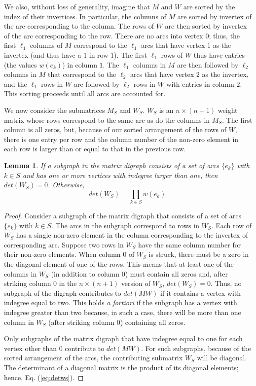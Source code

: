\documentclass{article}
\newtheorem{lemma}{Lemma}
\begin{document}
We also, without loss of generality, imagine that $M$ and $W$
are sorted by the index of their invertices.  In particular,
the columns of $M$ are sorted by invertex of the arc corresponding to
the column.  The rows of $W$ are then sorted by invertex of the arc
corresponding to the row.  There are no arcs into
vertex $0$; thus, the first $\ell_1$ columns of $M$ correspond to the $\ell_1$
arcs that have vertex $1$ as the invertex (and thus have a $1$ in row $1$).
The first $\ell_1$ rows of $W$ thus have entries (the values $w(e_k)$)
in column $1$.  The $\ell_1$ columns in $M$ are then followed by $\ell_2$
columns in $M$ that correspond to the $\ell_2$ arcs that have vertex $2$
as the invertex, and the $\ell_1$ rows in $W$ are followed by $\ell_2$
rows in $W$ with entries in column $2$.  This sorting proceeds until all arcs
are accounted for.

We now consider the submatrices $M_S$ and $W_S$.
$W_S$ is an
$n \times (n + 1)$ weight matrix whose rows correspond to the same arc as do
the columns in
$M_S$.  The first column is all zeros, but, because of our sorted arrangement
of the rows of $W$, there is one entry per row and the column number of
the non-zero element in each row is larger than or equal to that
in the previous row.

\begin{lemma}
If a subgraph in the matrix digraph consists of a set of
arcs $\{e_k\}$ with $k \in S$
and has one or more
vertices with indegree larger than one, then $det(W_S) = 0$.  Otherwise,
\begin{equation}
det(W_S) = \prod_{k \in S} w(e_k).
\label{eq:detws}
\end{equation}
\label{lemma:detws}
\end{lemma}

\begin{proof}
Consider a subgraph of the matrix digraph that consists of
a set of arcs $\{e_k\}$ with $k \in S$.
The arcs in the subgraph correspond to rows in $W_S$.
Each row of $W_S$ has a single non-zero element in the column corresponding
to the invertex of corresponding arc.
Suppose two rows in $W_S$ have
the same column number for their non-zero elements.  When column 0 of
$W_S$ is struck, there must be a
zero in the diagonal element of one of the rows.
This means that at least one
of the columns in $W_S$ (in addition to column $0$)
must contain all zeros and, after striking
column $0$ in the $n \times (n+1)$ version of $W_S$, $det(W_S) = 0$.
Thus,
no subgraph of the digraph contributes to $det( MW)$
if it contains
a vertex with indegree equal to two.  This holds {\em a fortiori} if 
the subgraph has a vertex with
indegree greater than two because, in such a case, there
will be more than one column in $W_S$ (after striking column $0$) containing
all zeros.

Only subgraphs of the matrix digraph that have indegree equal to
one for each vertex other than $0$ contribute to $det(MW)$.  For such
subgraphs, because of the sorted arrangement of the arcs, the contributing
submatrix $W_S$ will be diagonal.  The determinant of a diagonal
matrix is the product of its diagonal elements; hence, Eq. (\ref{eq:detws}).
\end{proof}
\end{document}
